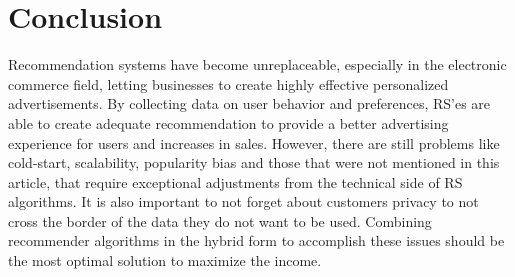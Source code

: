 \documentclass[10pt,twoside,english,a4paper]{article}
\begin{document}
\section{Conclusion}
Recommendation systems have become unreplaceable, especially in the electronic commerce field, letting businesses to create highly effective personalized advertisements.
By collecting data on user behavior and preferences, RS'es are able to create adequate recommendation to provide a better advertising experience for users and increases in sales.
However, there are still problems like cold-start, scalability, popularity bias and those that were not mentioned in this article, that require exceptional adjustments from the technical side of RS algorithms. It is also important to not forget about customers privacy to not cross the border of the data they do not want to be used.  Combining recommender algorithms in the hybrid form to accomplish these issues should be the most optimal solution to maximize the income.





\end{document}
